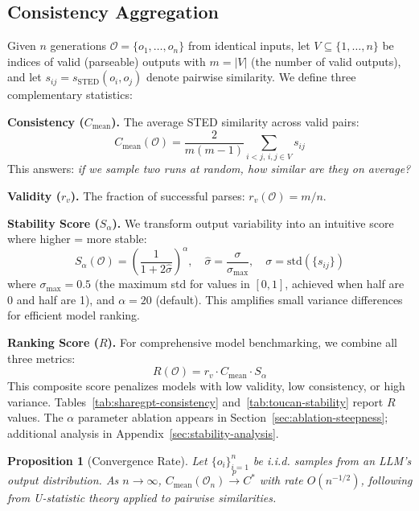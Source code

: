 \documentclass{article}
\theoremstyle{plain}
\newtheorem{proposition}[theorem]{Proposition}
\theoremstyle{definition}
\begin{document}
\subsection{Consistency Aggregation}
\label{sec:stability-score}

Given $n$ generations $\mathcal{O} = \{o_1, \ldots, o_n\}$ from identical inputs, let $V \subseteq \{1,\ldots,n\}$ be indices of valid (parseable) outputs with $m = |V|$ (the number of valid outputs), and let $s_{ij} = s_{\text{STED}}(o_i, o_j)$ denote pairwise similarity. We define three complementary statistics:

\textbf{Consistency ($C_{\text{mean}}$).} The average STED similarity across valid pairs:
\begin{equation}
C_{\text{mean}}(\mathcal{O}) = \frac{2}{m(m-1)} \sum_{i<j,\, i,j \in V} s_{ij}
\end{equation}
This answers: \textit{if we sample two runs at random, how similar are they on average?}

\textbf{Validity ($r_v$).} The fraction of successful parses: $r_v(\mathcal{O}) = m/n$.

\textbf{Stability Score ($S_{\alpha}$).} We transform output variability into an intuitive score where higher = more stable:
\begin{equation}
S_{\alpha}(\mathcal{O}) = \left(\frac{1}{1 + 2\hat{\sigma}}\right)^{\alpha}, \quad \hat{\sigma} = \frac{\sigma}{\sigma_{\max}}, \quad \sigma = \text{std}(\{s_{ij}\})
\end{equation}
where $\sigma_{\max} = 0.5$ (the maximum std for values in $[0,1]$, achieved when half are 0 and half are 1), and $\alpha=20$ (default). This amplifies small variance differences for efficient model ranking.

\textbf{Ranking Score ($R$).} For comprehensive model benchmarking, we combine all three metrics:
\begin{equation}
R(\mathcal{O}) = r_v \cdot C_{\text{mean}} \cdot S_{\alpha}
\end{equation}
This composite score penalizes models with low validity, low consistency, or high variance. Tables~\ref{tab:sharegpt-consistency} and~\ref{tab:toucan-stability} report $R$ values. The $\alpha$ parameter ablation appears in Section~\ref{sec:ablation-steepness}; additional analysis in Appendix~\ref{sec:stability-analysis}.

\begin{proposition}[Convergence Rate]
\label{prop:convergence}
Let $\{o_i\}_{i=1}^n$ be i.i.d. samples from an LLM's output distribution. As $n \to \infty$, $C_{\text{mean}}(\mathcal{O}_n) \xrightarrow{p} C^*$ with rate $O(n^{-1/2})$, following from U-statistic theory applied to pairwise similarities.
\end{proposition}
\end{document}
